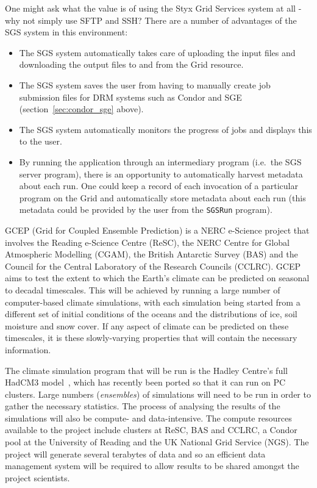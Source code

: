 \documentclass[times,10pt,twocolumn,8.5x11]{article}
\begin{document}
One might ask what the value is of using the Styx Grid Services system at all - why not simply use SFTP and SSH?  There are a number of advantages of the SGS system in this environment:

\begin{itemize}
\item The SGS system automatically takes care of uploading the input files and downloading the output files to and from the Grid resource.
\item The SGS system saves the user from having to manually create job submission files for DRM systems such as Condor and SGE (section~\ref{sec:condor_sge} above).
\item The SGS system automatically monitors the progress of jobs and displays this to the user.
\item By running the application through an intermediary program (i.e.\ the SGS server program), there is an opportunity to automatically harvest metadata about each run.  One could keep a record of each invocation of a particular program on the Grid and automatically store metadata about each run (this metadata could be provided by the user from the {\tt SGSRun} program).
\end{itemize}

GCEP (Grid for Coupled Ensemble Prediction) is a NERC e-Science project that involves the Reading e-Science Centre (ReSC), the NERC Centre for Global Atmospheric Modelling (CGAM), the British Antarctic Survey (BAS) and the Council for the Central Laboratory of the Research Councils (CCLRC).  GCEP aims to test the extent to which the Earth's climate can be predicted on seasonal to decadal timescales.  This will be achieved by running a large number of computer-based climate simulations, with each simulation being started from a different set of initial conditions of the oceans and the distributions of ice, soil moisture and snow cover.  If any aspect of climate can be predicted on these timescales, it is these slowly-varying properties that will contain the necessary information.

The climate simulation program that will be run is the Hadley Centre's full HadCM3 model~\cite{hadcm3}, which has recently been ported so that it can run on PC clusters.  Large numbers ({\em ensembles\/}) of simulations will need to be run in order to gather the necessary statistics.  The process of analysing the results of the simulations will also be compute- and data-intensive.  The compute resources available to the project include clusters at ReSC, BAS and CCLRC, a Condor pool at the University of Reading and the UK National Grid Service (NGS).  The project will generate several terabytes of data and so an efficient data management system will be required to allow results to be shared amongst the project scientists.
\end{document}
